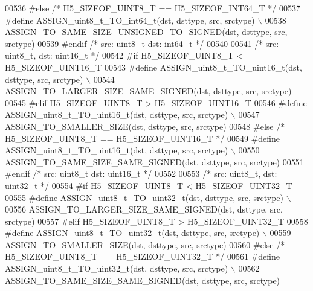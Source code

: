 \begin{DoxyCode}
00536 \textcolor{preprocessor}{#else }\textcolor{comment}{/* H5\_SIZEOF\_UINT8\_T == H5\_SIZEOF\_INT64\_T */}\textcolor{preprocessor}{}
00537 \textcolor{preprocessor}{    #define ASSIGN\_uint8\_t\_TO\_int64\_t(dst, dsttype, src, srctype) \(\backslash\)}
00538 \textcolor{preprocessor}{        ASSIGN\_TO\_SAME\_SIZE\_UNSIGNED\_TO\_SIGNED(dst, dsttype, src, srctype)}
00539 \textcolor{preprocessor}{#endif }\textcolor{comment}{/* src: uint8\_t dst: int64\_t */}\textcolor{preprocessor}{}
00540 
00541 \textcolor{comment}{/* src: uint8\_t, dst: uint16\_t */}
00542 \textcolor{preprocessor}{#if H5\_SIZEOF\_UINT8\_T < H5\_SIZEOF\_UINT16\_T}
00543 \textcolor{preprocessor}{    #define ASSIGN\_uint8\_t\_TO\_uint16\_t(dst, dsttype, src, srctype) \(\backslash\)}
00544 \textcolor{preprocessor}{        ASSIGN\_TO\_LARGER\_SIZE\_SAME\_SIGNED(dst, dsttype, src, srctype)}
00545 \textcolor{preprocessor}{#elif H5\_SIZEOF\_UINT8\_T > H5\_SIZEOF\_UINT16\_T}
00546 \textcolor{preprocessor}{    #define ASSIGN\_uint8\_t\_TO\_uint16\_t(dst, dsttype, src, srctype) \(\backslash\)}
00547 \textcolor{preprocessor}{        ASSIGN\_TO\_SMALLER\_SIZE(dst, dsttype, src, srctype)}
00548 \textcolor{preprocessor}{#else }\textcolor{comment}{/* H5\_SIZEOF\_UINT8\_T == H5\_SIZEOF\_UINT16\_T */}\textcolor{preprocessor}{}
00549 \textcolor{preprocessor}{    #define ASSIGN\_uint8\_t\_TO\_uint16\_t(dst, dsttype, src, srctype) \(\backslash\)}
00550 \textcolor{preprocessor}{        ASSIGN\_TO\_SAME\_SIZE\_SAME\_SIGNED(dst, dsttype, src, srctype)}
00551 \textcolor{preprocessor}{#endif }\textcolor{comment}{/* src: uint8\_t dst: uint16\_t */}\textcolor{preprocessor}{}
00552 
00553 \textcolor{comment}{/* src: uint8\_t, dst: uint32\_t */}
00554 \textcolor{preprocessor}{#if H5\_SIZEOF\_UINT8\_T < H5\_SIZEOF\_UINT32\_T}
00555 \textcolor{preprocessor}{    #define ASSIGN\_uint8\_t\_TO\_uint32\_t(dst, dsttype, src, srctype) \(\backslash\)}
00556 \textcolor{preprocessor}{        ASSIGN\_TO\_LARGER\_SIZE\_SAME\_SIGNED(dst, dsttype, src, srctype)}
00557 \textcolor{preprocessor}{#elif H5\_SIZEOF\_UINT8\_T > H5\_SIZEOF\_UINT32\_T}
00558 \textcolor{preprocessor}{    #define ASSIGN\_uint8\_t\_TO\_uint32\_t(dst, dsttype, src, srctype) \(\backslash\)}
00559 \textcolor{preprocessor}{        ASSIGN\_TO\_SMALLER\_SIZE(dst, dsttype, src, srctype)}
00560 \textcolor{preprocessor}{#else }\textcolor{comment}{/* H5\_SIZEOF\_UINT8\_T == H5\_SIZEOF\_UINT32\_T */}\textcolor{preprocessor}{}
00561 \textcolor{preprocessor}{    #define ASSIGN\_uint8\_t\_TO\_uint32\_t(dst, dsttype, src, srctype) \(\backslash\)}
00562 \textcolor{preprocessor}{        ASSIGN\_TO\_SAME\_SIZE\_SAME\_SIGNED(dst, dsttype, src, srctype)}

\end{DoxyCode}
